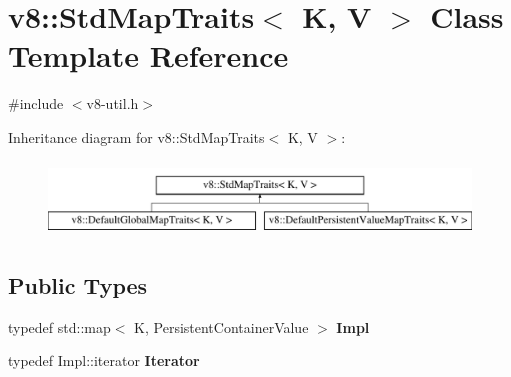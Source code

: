 \hypertarget{classv8_1_1StdMapTraits}{}\section{v8\+:\+:Std\+Map\+Traits$<$ K, V $>$ Class Template Reference}
\label{classv8_1_1StdMapTraits}


{\ttfamily \#include $<$v8-\/util.\+h$>$}

Inheritance diagram for v8\+:\+:Std\+Map\+Traits$<$ K, V $>$\+:\begin{figure}[H]
\begin{center}
\leavevmode
\includegraphics[height=2.000000cm]{classv8_1_1StdMapTraits}
\end{center}
\end{figure}
\subsection*{Public Types}
\begin{DoxyCompactItemize}
\item 
typedef std\+::map$<$ K, Persistent\+Container\+Value $>$ {\bfseries Impl}\hypertarget{classv8_1_1StdMapTraits_ac64cb78b3ef5cfbc35cf03837552e4ea}{}\label{classv8_1_1StdMapTraits_ac64cb78b3ef5cfbc35cf03837552e4ea}

\item 
typedef Impl\+::iterator {\bfseries Iterator}\hypertarget{classv8_1_1StdMapTraits_ad20ef2022e83bfba6dcee23a2a34098e}{}\label{classv8_1_1StdMapTraits_ad20ef2022e83bfba6dcee23a2a34098e}

\end{DoxyCompactItemize}
